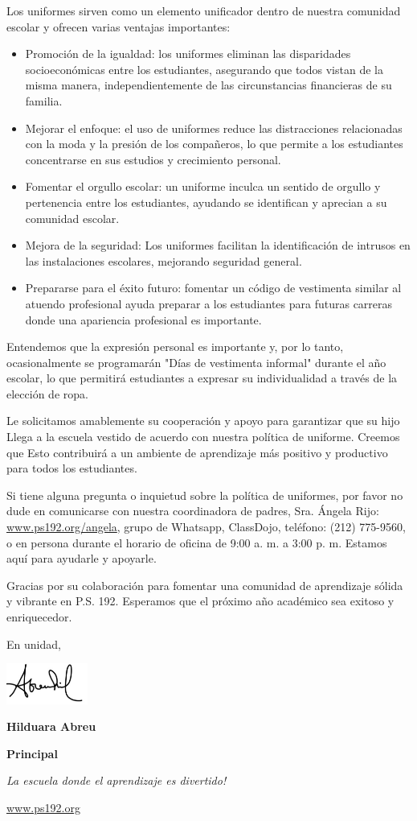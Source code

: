 \documentclass[12pt,letterpaper]{article}
\begin{document}
Los uniformes sirven como un elemento unificador dentro de nuestra comunidad escolar y ofrecen varias ventajas importantes:
		\begin{itemize}
		\item Promoción de la igualdad: los uniformes eliminan las disparidades socioeconómicas entre los estudiantes, asegurando que todos vistan de la misma manera, independientemente de las circunstancias financieras de su familia.
		\item Mejorar el enfoque: el uso de uniformes reduce las distracciones relacionadas con la moda y la presión de los compañeros, lo que permite a los estudiantes concentrarse en sus estudios y crecimiento personal.
		\item Fomentar el orgullo escolar: un uniforme inculca un sentido de orgullo y pertenencia entre los estudiantes, ayudando se identifican y aprecian a su comunidad escolar.
		\item Mejora de la seguridad: Los uniformes facilitan la identificación de intrusos en las instalaciones escolares, mejorando seguridad general.
		\item Prepararse para el éxito futuro: fomentar un código de vestimenta similar al atuendo profesional ayuda preparar a los estudiantes para futuras carreras donde una apariencia profesional es importante.
		\end{itemize}
\pagebreak
\vspace*{1.5cm}
Entendemos que la expresión personal es importante y, por lo tanto, ocasionalmente se programarán "Días de vestimenta informal" durante el año escolar, lo que permitirá estudiantes a expresar su individualidad a través de la elección de ropa.

Le solicitamos amablemente su cooperación y apoyo para garantizar que su hijo
Llega a la escuela vestido de acuerdo con nuestra política de uniforme. Creemos que Esto contribuirá a un ambiente de aprendizaje más positivo y productivo para
todos los estudiantes.

Si tiene alguna pregunta o inquietud sobre la política de uniformes, por favor
no dude en comunicarse con nuestra coordinadora de padres, Sra. Ángela Rijo:
\url{www.ps192.org/angela}, grupo de Whatsapp, ClassDojo, teléfono: (212) 775-9560, o en persona durante el horario de oficina de 9:00 a. m. a 3:00 p. m. Estamos aquí para ayudarle y apoyarle.

Gracias por su colaboración para fomentar una comunidad de aprendizaje sólida y vibrante en P.S. 192. Esperamos que el próximo año académico sea exitoso y enriquecedor.


En unidad,

\includegraphics[width=0.2\textwidth]{hil_signature}

\textbf{Hilduara Abreu}

\textbf{Principal}

\textit{La escuela donde el aprendizaje es divertido!}

\url{www.ps192.org}
\end{document}

